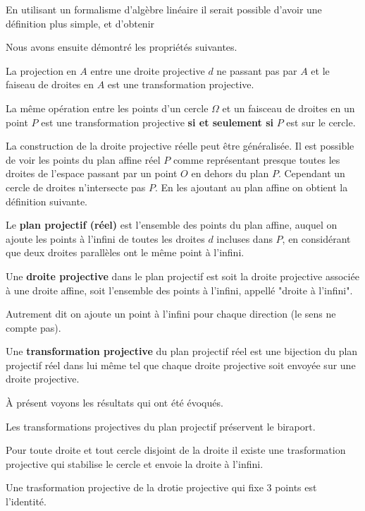 En utilisant un formalisme d'algèbre linéaire il serait possible d'avoir une définition plus simple, et d'obtenir 

Nous avons ensuite démontré les propriétés suivantes.

\begin{prop}
La projection en $A$ entre une droite projective $d$ ne passant pas par $A$ et le faiseau de droites en $A$ est une transformation projective. 

\smallskip

La même opération entre les points d'un cercle $\Omega$ et un faisceau de droites en un point $P$ est une transformation projective \textbf{si et seulement si} $P$ est sur le cercle. 
\end{prop}
\medskip

La construction de la droite projective réelle peut être généralisée. Il est possible de voir les points du plan affine réel $P$ comme représentant presque toutes les droites de l'espace passant par un point $O$ en dehors du plan $P$. Cependant un cercle de droites n'intersecte pas $P$. En les ajoutant au plan affine on obtient la définition suivante.

\begin{defn}

Le \textbf{plan projectif (réel)} est l'ensemble des points du plan affine, auquel on ajoute les points à l'infini de toutes les droites $d$ incluses dans $P$, en considérant que deux droites parallèles ont le même point à l'infini. 

\medskip

Une \textbf{droite projective} dans le plan projectif est soit la droite projective associée à une droite affine, soit l'ensemble des points à l'infini, appellé "droite à l'infini".

\end{defn}

Autrement dit on ajoute un point à l'infini pour chaque direction (le sens ne compte pas).

\begin{defn}
Une \textbf{transformation projective} du plan projectif réel est une bijection du plan projectif réel dans lui même tel que chaque droite projective soit envoyée sur une droite projective.
\end{defn}

À présent voyons les résultats qui ont été évoqués.

\begin{prop}
Les transformations projectives du plan projectif préservent le biraport. 

\medskip

Pour toute droite et tout cercle disjoint de la droite il existe une trasformation projective qui stabilise le cercle et envoie la droite à l'infini.

\medskip

Une trasformation projective de la drotie projective qui fixe $3$ points est l'identité.

\end{prop}

